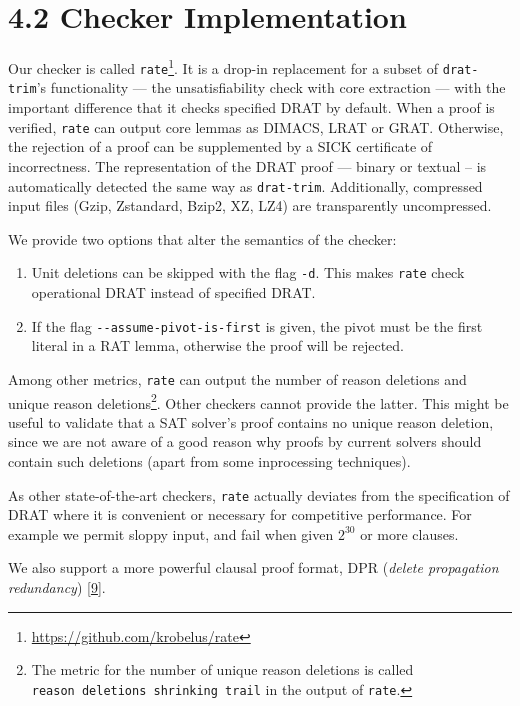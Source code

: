 \documentclass[
]{report}
\begin{document}
\hypertarget{checker-implementation}{%
\section{4.2 Checker Implementation}\label{checker-implementation}}

Our checker is called \texttt{rate}\footnote{\url{https://github.com/krobelus/rate}}.
It is a drop-in replacement for a subset of \texttt{drat-trim}'s
functionality --- the unsatisfiability check with core extraction ---
with the important difference that it checks specified DRAT by default.
When a proof is verified, \texttt{rate} can output core lemmas as
DIMACS, LRAT or GRAT. Otherwise, the rejection of a proof can be
supplemented by a SICK certificate of incorrectness. The representation
of the DRAT proof --- binary or textual -- is automatically detected the
same way as \texttt{drat-trim}. Additionally, compressed input files
(Gzip, Zstandard, Bzip2, XZ, LZ4) are transparently uncompressed.

We provide two options that alter the semantics of the checker:

\begin{enumerate}
\def\labelenumi{\arabic{enumi}.}
\item
  Unit deletions can be skipped with the flag \texttt{-d}. This makes
  \texttt{rate} check operational DRAT instead of specified DRAT.
\item
  If the flag \texttt{-\/-assume-pivot-is-first} is given, the pivot
  must be the first literal in a RAT lemma, otherwise the proof will be
  rejected.
\end{enumerate}

Among other metrics, \texttt{rate} can output the number of reason
deletions and unique reason deletions\footnote{The metric for the number
  of unique reason deletions is called
  \texttt{reason\ deletions\ shrinking\ trail} in the output of
  \texttt{rate}.}. Other checkers cannot provide the latter. This might
be useful to validate that a SAT solver's proof contains no unique
reason deletion, since we are not aware of a good reason why proofs by
current solvers should contain such deletions (apart from some
inprocessing techniques).

As other state-of-the-art checkers, \texttt{rate} actually deviates from
the specification of DRAT where it is convenient or necessary for
competitive performance. For example we permit sloppy input, and fail
when given \(2^{30}\) or more clauses.

We also support a more powerful clausal proof format, DPR (\emph{delete
propagation redundancy}) {[}\protect\hyperlink{ref-Heule_2017}{9}{]}.
\end{document}
